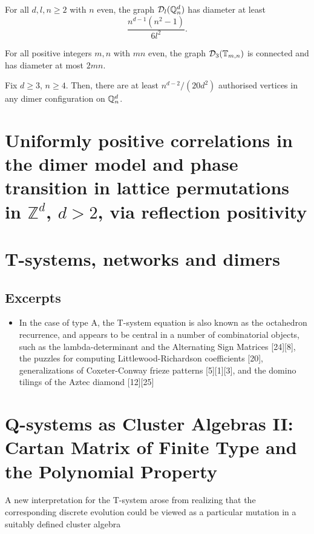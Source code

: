 \begin{theorem}\label{thm-dynamics-7}
	For all $d, l, n \geq 2$ with $n$ even, the graph $\mathcal{D}_{l}(\mathbb{Q}^d_n)$ has diameter at least $$\frac{n^{d - 1} (n^2 - 1)}{6l^2}.$$
\end{theorem}

\begin{theorem}[Ergodicity on $\bT_{m,n}$]\label{thm-dynamics-8}
	For all positive integers $m, n$ with $mn$ even, the graph $\mathcal{D}_{3}(\mathbb{T}_{m,n})$ is connected and has diameter at most $2mn$.
\end{theorem}

\begin{lemma}\label{lemma-dynamics-10}
	Fix $d \geq 3$, $n \geq 4$. Then, there are at least $n^{d-2}/(20d^2)$ authorised vertices in any dimer configuration on $\mathbb{Q}_n^d$. 
\end{lemma}

\section{Uniformly positive correlations in the dimer model and
	phase transition in lattice permutations in $\mathbb{Z}^d$, $d > 2$, via reflection positivity \cite{taggi2019uniformly}}

\section{T-systems, networks and dimers \cite{di2014tystemsnetworksdimers}	}
\subsection{Excerpts}
\begin{itemize}
	\item  In the case of type A, the T-system equation is also known as the octahedron recurrence, and appears to be central in a number of combinatorial objects, such as the lambda-determinant and the Alternating Sign Matrices [24][8], the puzzles for computing Littlewood-Richardson coefficients [20], generalizations of Coxeter-Conway frieze patterns [5][1][3], and the domino tilings of the Aztec diamond [12][25]
\end{itemize}

\section{Q-systems as Cluster Algebras {II}: Cartan Matrix of Finite Type and the Polynomial Property \cite{Di_Francesco_2009}}
A new interpretation for the T-system arose from realizing that the corresponding discrete evolution could be viewed as a particular mutation in a suitably defined cluster algebra


